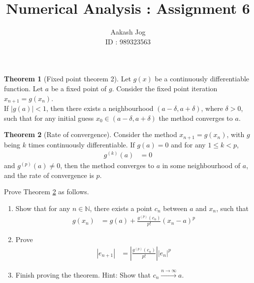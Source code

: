 \documentclass[fleqn, a4paper, 11pt, oneside]{amsart}
\title{Numerical Analysis : Assignment 6}
\author
{
	Aakash Jog\\
	ID : 989323563
}
\date{\formatdate{24}{11}{2015}}
\theoremstyle{definition}
\theoremstyle{theorem}
\newtheorem{theorem}{Theorem}
\begin{document}

\maketitle

\begin{theorem}[Fixed point theorem 2]
	Let $g(x)$ be a continuously differentiable function.
	Let $a$ be a fixed point of $g$.
	Consider the fixed point iteration $x_{n + 1} = g(x_n)$.\\
	If $\left| g(a) \right| < 1$, then there exists a neighbourhood $(a - \delta , a + \delta)$, where $\delta > 0$, such that for any initial guess $x_0 \in (a - \delta , a + \delta)$ the method converges to $a$.
	\label{thm:Fixed_point_theorem_2}
\end{theorem}

\begin{theorem}[Rate of convergence]
	Consider the method $x_{n + 1} = g(x_n)$, with $g$ being $k$ times continuously differentiable.
	If $g(a) = 0$ and for any $1 \le k < p$,
	\begin{align*}
		g^{(k)}(a) & = 0
	\end{align*}
	and $g^{(p)}(a) \neq 0$, then the method converges to $a$ in some neighbourhood of $a$, and the rate of convergence is $p$.
	\label{thm:Rate_of_convergence}
\end{theorem}

\begin{question}
	Prove Theorem \ref{thm:Rate_of_convergence} as follows.
	\begin{enumerate}
		\item
			Show that for any $n \in \mathbb{N}$, there exists a point $c_n$ between $a$ and $x_n$, such that
			\begin{align*}
				g(x_n) & = g(a) + \frac{g^{(p)}(c_n)}{p!} (x_n - a)^p
			\end{align*}
		\item
			Prove
			\begin{align*}
				|e_{n + 1}| & = \left| \frac{g^{(p)}(c_n)}{p!} \right| |e_n|^p
			\end{align*}
		\item
			Finish proving the theorem.
			Hint: Show that $c_n \xrightarrow{n \to \infty} a$.
	\end{enumerate}
\end{question}
\end{document}
